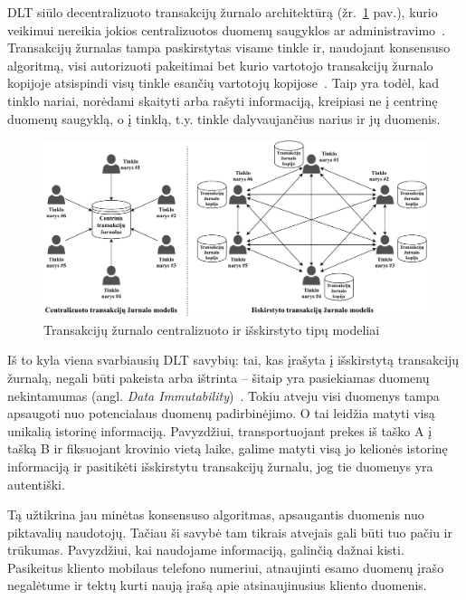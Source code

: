 DLT siūlo decentralizuoto transakcijų žurnalo architektūrą (žr.~\ref{img:5} pav.), kurio veikimui nereikia jokios centralizuotos duomenų saugyklos ar administravimo~\cite{yu2018virtualization}. Transakcijų žurnalas tampa paskirstytas visame tinkle ir, naudojant konsensuso algoritmą, visi autorizuoti pakeitimai bet kurio vartotojo transakcijų žurnalo kopijoje atsispindi visų tinkle esančių vartotojų kopijose~\cite{puthal2018blockchain}. Taip yra todėl, kad tinklo nariai, norėdami skaityti arba rašyti informaciją, kreipiasi ne į centrinę duomenų saugyklą, o į tinklą, t.y. tinkle dalyvaujančius narius ir jų duomenis.

\begin{figure}[H]
    \centering
    \includegraphics[scale=0.63]{images/ledger-model-types}
    \caption{Transakcijų žurnalo centralizuoto ir išskirstyto tipų modeliai}
    \label{img:5}
\end{figure}

Iš to kyla viena svarbiausių DLT savybių: tai, kas įrašyta į išskirstytą transakcijų žurnalą, negali būti pakeista arba ištrinta – šitaip yra pasiekiamas duomenų nekintamumas (angl. \textit{Data Immutability})~\cite{xu2017dl}. Tokiu atveju visi duomenys tampa apsaugoti nuo potencialaus duomenų padirbinėjimo. O tai leidžia matyti visą unikalią istorinę informaciją. Pavyzdžiui, transportuojant prekes iš taško A į tašką B ir fiksuojant krovinio vietą laike, galime matyti visą jo kelionės istorinę informaciją ir pasitikėti išskirstytu transakcijų žurnalu, jog tie duomenys yra autentiški. 

Tą užtikrina jau minėtas konsensuso algoritmas, apsaugantis duomenis nuo piktavalių naudotojų. Tačiau ši savybė tam tikrais atvejais gali būti tuo pačiu ir trūkumas. Pavyzdžiui, kai naudojame informaciją, galinčią dažnai kisti. Pasikeitus kliento mobilaus telefono numeriui, atnaujinti esamo duomenų įrašo negalėtume ir tektų kurti naują įrašą apie atsinaujinusius kliento duomenis.



